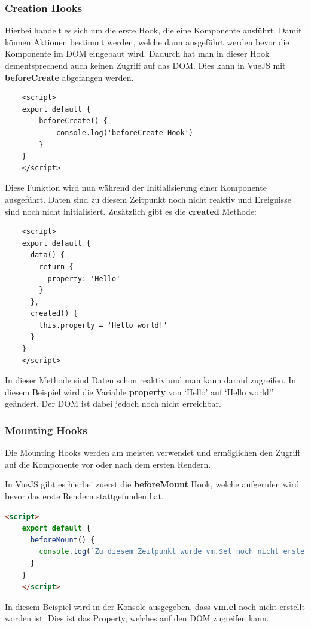 \subsubsection{Creation Hooks}
Hierbei handelt es sich um die erste Hook, die eine Komponente ausführt. Damit können Aktionen bestimmt werden, welche dann ausgeführt werden bevor die Komponente im DOM eingebaut wird. Dadurch hat man in dieser Hook dementsprechend auch keinen Zugriff auf das DOM.
Dies kann in VueJS mit \textbf{beforeCreate} abgefangen werden.

\begin{lstlisting}
    <script>
    export default {
    	beforeCreate() {
    		console.log('beforeCreate Hook')
    	}
    }
    </script>
\end{lstlisting}

Diese Funktion wird nun während der Initialisierung einer Komponente ausgeführt. Daten sind zu diesem Zeitpunkt noch nicht reaktiv und Ereignisse sind noch nicht initialisiert.
Zusätzlich gibt es die \textbf{created} Methode:

\begin{lstlisting}
    <script>
    export default {
      data() {
        return {
          property: 'Hello'
        }
      },
      created() {
        this.property = 'Hello world!'
      }
    }
    </script>
\end{lstlisting}

In dieser Methode sind Daten schon reaktiv und man kann darauf zugreifen. In diesem Beispiel wird die Variable \textbf{property} von ‘Hello’ auf ‘Hello world!’ geändert. Der DOM ist dabei jedoch noch nicht erreichbar.

\subsubsection{Mounting Hooks}
Die Mounting Hooks werden am meisten verwendet und ermöglichen den Zugriff auf die Komponente vor oder nach dem ersten Rendern.

In VueJS gibt es hierbei zuerst die \textbf{beforeMount} Hook, welche aufgerufen wird bevor das erste Rendern stattgefunden hat.

\begin{lstlisting}[language=html]
    <script>
    export default {
      beforeMount() {
        console.log(`Zu diesem Zeitpunkt wurde vm.$el noch nicht erstellt.`)
      }
    }
    </script>
\end{lstlisting}

In diesem Beispiel wird in der Konsole ausgegeben, dass \textbf{vm.el} noch nicht erstellt worden ist. Dies ist das Property, welches auf den DOM zugreifen kann. 

